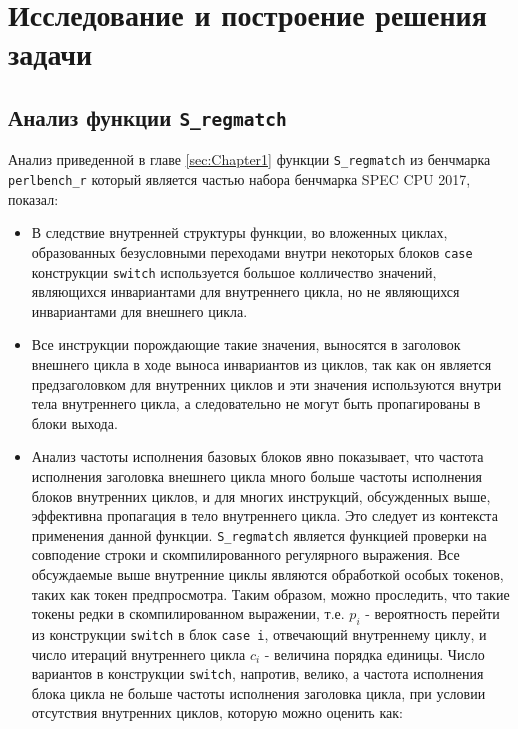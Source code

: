 \chapter{Исследование и построение решения задачи}
\label{sec:Chapter3} 

\section{Анализ функции \texttt{S\_regmatch}}

Анализ приведенной в главе \ref{sec:Chapter1} функции \texttt{S\_regmatch} из бенчмарка \texttt{perlbench\_r} который является частью набора бенчмарка SPEC CPU\textsuperscript{\tiny\textregistered} 2017, показал:
\begin{itemize}
    \item В следствие внутренней структуры функции, во вложенных циклах, образованных безусловными переходами внутри некоторых блоков \texttt{case} конструкции \texttt{switch} используется большое колличество значений, являющихся инвариантами для внутреннего цикла, но не являющихся инвариантами для внешнего цикла.
    \item Все инструкции порождающие такие значения, выносятся в заголовок внешнего цикла в ходе выноса инвариантов из циклов, так как он является предзаголовком для внутренних циклов и эти значения используются внутри тела внутреннего цикла, а следовательно не могут быть пропагированы в блоки выхода.
    \item Анализ частоты исполнения базовых блоков явно показывает, что частота исполнения заголовка внешнего цикла много больше частоты исполнения блоков внутренних циклов, и для многих инструкций, обсужденных выше, эффективна пропагация в тело внутреннего цикла.
        Это следует из контекста применения данной функции.
        \texttt{S\_regmatch} является функцией проверки на совподение строки и скомпилированного регулярного выражения.
        Все обсуждаемые выше внутренние циклы являются обработкой особых токенов, таких как токен предпросмотра.
        Таким образом, можно проследить, что такие токены редки в скомпилированном выражении, т.е. $p_i$ - вероятность перейти из конструкции \texttt{switch} в блок \texttt{case i}, отвечающий внутреннему циклу, и число итераций внутреннего цикла $c_i$ - величина порядка единицы.
        Число вариантов в конструкции \texttt{switch}, напротив, велико, а частота исполнения блока цикла не больше частоты исполнения заголовка цикла, при условии отсутствия внутренних циклов, которую можно оценить как:

\end{itemize}
